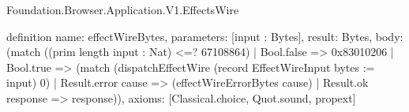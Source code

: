 \begin{lexlean}{Foundation.Browser.Application.V1.EffectsWire}
\begin{semanticmodule}
definition{
  name: effectWireBytes,
  parameters: [input : Bytes],
  result: Bytes,
  body: (match ((prim length input : Nat) <=? 67108864)
    | Bool.false => 0x83010206
    | Bool.true => (match (dispatchEffectWire (record EffectWireInput {bytes := input}) 0)
      | Result.error cause => (effectWireErrorBytes cause)
      | Result.ok response => response)),
  axioms: [Classical.choice, Quot.sound, propext]
}
\end{semanticmodule}
\end{lexlean}
